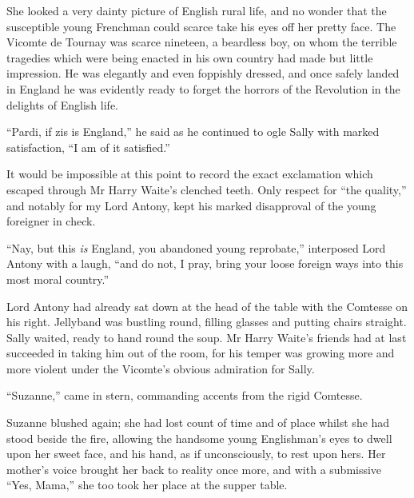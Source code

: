 She looked a very dainty picture of English rural life, and no wonder that the susceptible young Frenchman could scarce take his eyes off her pretty face. The Vicomte de Tournay was scarce nineteen, a beardless boy, on whom the terrible tragedies which were being enacted in his own country had made but little impression. He was elegantly and even foppishly dressed, and once safely landed in England he was evidently ready to forget the horrors of the Revolution in the delights of English life.

\enquote{Pardi, if zis is England,} he said as he continued to ogle Sally with marked satisfaction, \enquote{I am of it satisfied.}

It would be impossible at this point to record the exact exclamation which escaped through Mr Harry Waite's clenched teeth. Only respect for \enquote{the quality,} and notably for my Lord Antony, kept his marked disapproval of the young foreigner in check.

\enquote{Nay, but this \textit{is} England, you abandoned young reprobate,} interposed Lord Antony with a laugh, \enquote{and do not, I pray, bring your loose foreign ways into this most moral country.}

Lord Antony had already sat down at the head of the table with the Comtesse on his right. Jellyband was bustling round, filling glasses and putting chairs straight. Sally waited, ready to hand round the soup. Mr Harry Waite's friends had at last succeeded in taking him out of the room, for his temper was growing more and more violent under the Vicomte's obvious admiration for Sally.

\enquote{Suzanne,} came in stern, commanding accents from the rigid Comtesse.

Suzanne blushed again; she had lost count of time and of place whilst she had stood beside the fire, allowing the handsome young Englishman's eyes to dwell upon her sweet face, and his hand, as if unconsciously, to rest upon hers. Her mother's voice brought her back to reality once more, and with a submissive \enquote{Yes, Mama,} she too took her place at the supper table.
